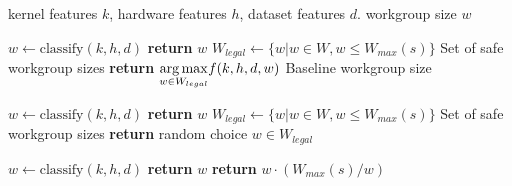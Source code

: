 \begin{algorithmic}[1]
\Require kernel features $k$, hardware features $h$, dataset features
$d$.
\Ensure workgroup size $w$

\State $w \leftarrow \text{classify}(k, h, d)$
    \State \textbf{return} $w$
\Else
  \State $W_{legal} \leftarrow \{w | w \in W, w \le W_{max}(s) \}$
  \Comment Set of safe workgroup sizes
  \State \textbf{return} $\underset{w \in W_{legal}}{\operatorname*{arg\,max}} f(k,h,d,w)$
  \Comment Baseline workgroup size
\EndIf
\EndProcedure
\item[]

\State $w \leftarrow \text{classify}(k, h, d)$
    \State \textbf{return} $w$
\Else
  \State $W_{legal} \leftarrow \{w | w \in W, w \le W_{max}(s) \}$
  \Comment Set of safe workgroup sizes
  \State \textbf{return} random choice $w \in W_{legal}$
\EndIf
\EndProcedure
\item[]

\State $w \leftarrow \text{classify}(k, h, d)$
    \State \textbf{return} $w$
\Else
  \State \textbf{return} $w \cdot (W_{max}(s) / w)$
\EndIf
\EndProcedure
\end{algorithmic}
